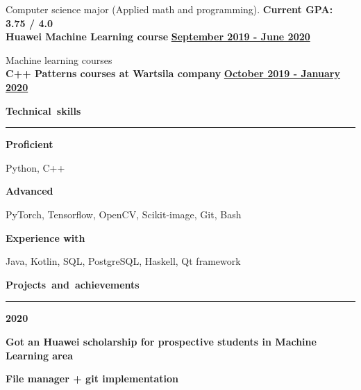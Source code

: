 \documentclass[11pt,a4paper]{report}
\begin{document}
\vspace{5px}
\hspace{10px}
Computer science major (Applied math and programming).
\hfill
\textbf{\large{Current GPA: 3.75 / 4.0}} \\


\textbf{Huawei Machine Learning course}
\hfill
\textbf{\underline{September 2019 - June 2020}}

\vspace{5px}
\hspace{10px}
Machine learning courses  \\

\textbf{C++ Patterns courses at Wartsila company}
\hfill
\textbf{\underline{October 2019 - January 2020}} \\


\par\hbox{\Large\textbf{Technical skills}}\kern5pt\hrule
\vspace{10px}


\textbf{Proficient} 

\vspace{5px}
\hspace{10px}
Python, C++
\vspace{5px}

\textbf{Advanced}

\vspace{5px}
\hspace{10px}
PyTorch, Tensorflow, OpenCV, Scikit-image, Git, Bash
\vspace{5px}

\textbf{Experience with}

\vspace{5px}
\hspace{10px}
Java, Kotlin, SQL, PostgreSQL, Haskell, Qt framework
\vspace{10px}


\par\hbox{\Large\textbf{Projects and achievements}}\kern5pt\hrule

\vspace{10px}
\textbf{\Large{2020}}

\hspace{10px}
\textbf{Got an Huawei scholarship for prospective students in Machine Learning area}

\vspace{10px}

\hspace{10px} \textbf{File manager + git implementation}
\end{document}
